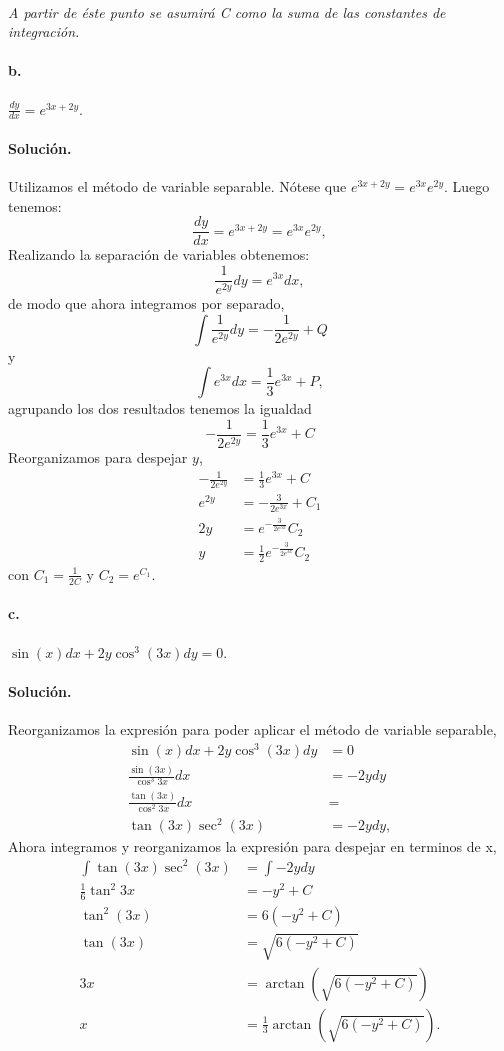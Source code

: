 \documentclass{article}
\DeclareMathOperator{\atan}{arctan}
\begin{document}
\paragraph{} \textit{A partir de éste punto se asumirá C como la suma de las constantes de integración.}
\paragraph{b.} $\frac{dy}{dx} = e^{3x + 2y}$.
\paragraph{Solución.} Utilizamos el método de variable separable. Nótese que
$e^{3x +2y} = e^{3x}e^{2y}$. Luego tenemos:
$$\frac{dy}{dx} = e^{3x + 2y} = e^{3x} e^{2y},$$
Realizando la separación de variables obtenemos:
$$\frac{1}{e^{2y}} dy = e^{3x} dx,$$
de modo que ahora integramos por separado,
$$\int \frac{1}{e^{2y}} dy = -\frac{1}{2e^{2y}} + Q$$
y
$$\int e^{3x} dx = \frac{1}{3} e^{3x} + P,$$
agrupando los dos resultados tenemos la igualdad
$$-\frac{1}{2e^{2y}} = \frac{1}{3} e^{3x} + C$$
Reorganizamos para despejar $y$,
\begin{align*}
	-\frac{1}{2e^{2y}} &= \frac{1}{3} e^{3x} + C\\
	e^{2y} &= -\frac{3}{2e^{3x}} + C_1\\
	2y &= e^{-\frac{3}{2e^{3x}}} C_2\\
	y &= \frac{1}{2} e^{-\frac{3}{2e^{3x}}} C_2
\end{align*}
con $C_1 = \frac{1}{2C}$ y $C_2 = e^{C_1}$.
\paragraph{c.} $\sin{(x)} dx + 2y \cos^{3}{(3x)} dy = 0$.
\paragraph{Solución.} Reorganizamos la expresión para poder aplicar el método de variable separable,
\begin{align*}
	\sin{(x)} dx + 2y \cos^{3}{(3x)} dy &= 0\\
	\frac{\sin{(3x)}}{\cos^{3}{3x}} dx &= -2y dy\\
	\frac{\tan{(3x)}}{\cos^2{3x}} dx &= \\
	\tan{(3x)} \sec^2{(3x)} &= -2ydy,
\end{align*}
Ahora integramos y reorganizamos la expresión para despejar en terminos de x,
\begin{align*}
	\int \tan{(3x)} \sec^2{(3x)} &= \int -2ydy\\
	\frac{1}{6} \tan^2{3x} &= -y^2 + C\\
	\tan^2{(3x)} &= 6(-y^2 + C)\\
	\tan{(3x)} &= \sqrt{6(-y^2 + C)}\\
	3x &= \atan{(\sqrt{6(-y^2 + C)})}\\
	x &= \frac{1}{3} \atan{(\sqrt{6(-y^2 + C)})}.
\end{align*}
\end{document}
